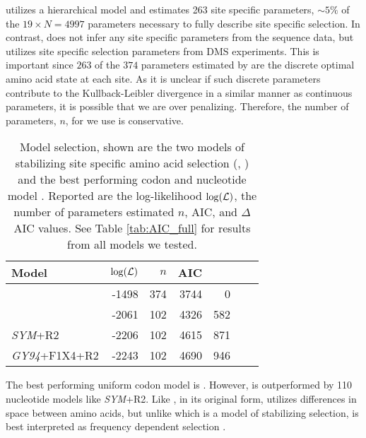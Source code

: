 \selac utilizes a hierarchical model and estimates 263 site specific parameters, $\sim5\%$ of the $19\times N = 4997$ parameters necessary to fully describe site specific selection.
In contrast, \phydms does not infer any site specific parameters from the sequence data, but utilizes site specific selection parameters from DMS experiments.
This is important since $263$ of the $374$ parameters estimated by \selac are the discrete optimal amino acid state at each site. 
As it is unclear if such discrete parameters contribute to the Kullback-Leibler divergence in a similar manner as continuous parameters, it is possible that we are over penalizing.
Therefore, the number of parameters, $n$, for \selac we use is conservative.

\begin{table}
  \centering
  \caption{Model selection, shown are the two models of stabilizing site specific amino acid selection (\selac, \phydms) and the best performing codon and nucleotide model \citep{GoldmanAndYang1994, zharkikh1994}. 
  Reported are the log-likelihood $\log(\mathcal{L})$, the number of parameters estimated $n$, AIC, and $\Delta$AIC values.
  See Table \ref{tab:AIC_full} for results from all models we tested.
}  
  \begin{tabular}{lrrrrrr}
    \hline
    Model							& $\log(\mathcal{L})$ & $n$ & AIC & \DeltaAIC \\ \hline 
    \selac							& -1498 & 374 & 3744 &  0 \\
    \phydms 						& -2061 & 102 & 4326 & 582 \\
    \emph{SYM}+R2 				& -2206 & 102 & 4615 & 871 \\
    \emph{GY94}+F1X4+R2 		& -2243 & 102 & 4690 & 946 \\ \hline
  \end{tabular}
  \label{tab:AIC_selac}
\end{table}

The best performing uniform codon model is \gy \citep{GoldmanAndYang1994}. 
However, \gy is outperformed by 110 nucleotide models like \emph{SYM}+R2.
Like \selac, \gy in its original form, utilizes differences in \PC space between amino acids, but unlike \selac which is a model of stabilizing selection, \gy is best interpreted as frequency dependent selection \citep{HughesAndNei1988,Nowak2006,Hughes2007,beaulieu2019}.

